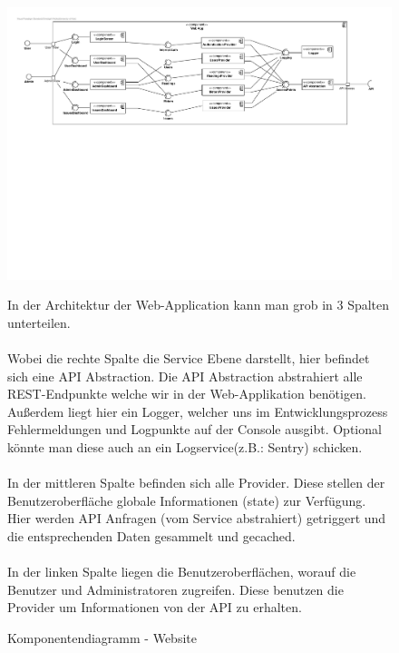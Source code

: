 
\begin{figure}[h]
	\hspace{-3cm}
	\includegraphics[scale = 0.6]{./img/Diagrams/Website-Components} 	
	\caption{Komponentendiagramm - Website} 

In der Architektur der Web-Application kann man grob in 3 Spalten unterteilen. 
\\ \\
Wobei die rechte Spalte die Service Ebene darstellt, hier befindet sich eine API Abstraction. Die API Abstraction abstrahiert alle REST-Endpunkte welche wir in der Web-Applikation benötigen. Außerdem liegt hier ein Logger, welcher uns im Entwicklungsprozess Fehlermeldungen und Logpunkte auf der Console ausgibt. Optional könnte man diese auch an ein Logservice(z.B.: Sentry) schicken.
\\ \\
In der mittleren Spalte befinden sich alle Provider. Diese stellen der Benutzeroberfläche globale Informationen (state) zur Verfügung. Hier werden API Anfragen (vom Service abstrahiert) getriggert und die entsprechenden Daten gesammelt und gecached.
\\ \\
In der linken Spalte liegen die Benutzeroberflächen, worauf die Benutzer und Administratoren zugreifen. Diese benutzen die Provider um Informationen von der API zu erhalten. 


\end{figure}

